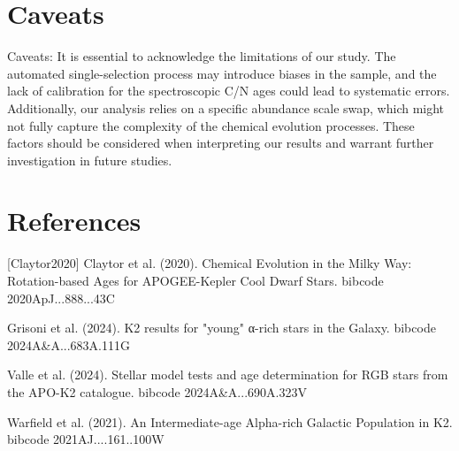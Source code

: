 \documentclass[twocolumn]{aastex631}
\begin{document}
\section{Caveats}
Caveats: It is essential to acknowledge the limitations of our study. The automated single-selection process may introduce biases in the sample, and the lack of calibration for the spectroscopic C/N ages could lead to systematic errors. Additionally, our analysis relies on a specific abundance scale swap, which might not fully capture the complexity of the chemical evolution processes. These factors should be considered when interpreting our results and warrant further investigation in future studies.
\section*{References}
\footnotesize
[Claytor2020] Claytor et al. (2020). Chemical Evolution in the Milky Way: Rotation-based Ages for APOGEE-Kepler Cool Dwarf Stars. bibcode 2020ApJ...888...43C \par [Grisoni2024] Grisoni et al. (2024). K2 results for "young" α-rich stars in the Galaxy. bibcode 2024A\&A...683A.111G \par [Valle2024] Valle et al. (2024). Stellar model tests and age determination for RGB stars from the APO-K2 catalogue. bibcode 2024A\&A...690A.323V \par [Warfield2021] Warfield et al. (2021). An Intermediate-age Alpha-rich Galactic Population in K2. bibcode 2021AJ....161..100W
\end{document}
